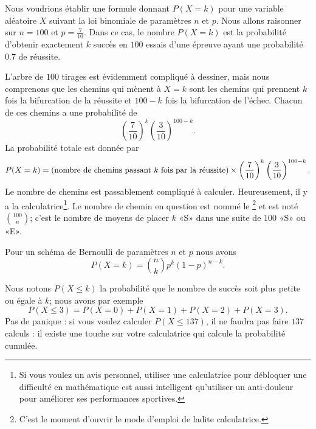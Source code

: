 Nous voudrions établir une formule donnant \( P(X=k)\) pour une variable aléatoire \( X\) suivant la loi binomiale de paramètres \( n\) et \( p\). Nous allons raisonner sur \( n=100\) et \( p=\frac{ 7 }{ 10 }\). Dans ce cas, le nombre \( P(X=k)\) est la probabilité d'obtenir exactement \( k\) succès en \( 100\) essais d'une épreuve ayant une probabilité \( 0.7\) de réussite.

L'arbre de \( 100\) tirages est évidemment compliqué à dessiner, mais nous comprenons que les chemins qui mènent à \( X=k\) sont les chemins qui prennent \( k\) fois la bifurcation de la réussite et \( 100-k\) fois la bifurcation de l'échec. Chacun de ces chemins a une probabilité de
\begin{equation}
    \left( \frac{ 7 }{ 10 } \right)^{k}\left( \frac{ 3 }{ 10 } \right)^{100-k}.
\end{equation}
La probabilité totale est donnée par
\begin{equation}
    P(X=k)=(\text{nombre de chemins passant \( k\) fois par la réussite})\times \left( \frac{ 7 }{ 10 } \right)^k\left( \frac{ 3 }{ 10 } \right)^{100-k}.
\end{equation}
Le nombre de chemins est passablement compliqué à calculer. Heureusement, il y a la calculatrice\footnote{Si vous voulez un avis personnel, utiliser une calculatrice pour débloquer une difficulté en mathématique est aussi intelligent qu'utiliser un anti-douleur pour améliorer ses performances sportives.}. Le nombre de chemin en question est nommé le \footnote{C'est le moment d'ouvrir le mode d'emploi de ladite calculatrice.} et est noté \( {100\choose n}\); c'est le nombre de moyens de placer \( k\) «S» dans une suite de \( 100\) «S» ou «E».

\begin{Aretenir}
    Pour un schéma de Bernoulli de paramètres \( n\) et \( p\) nous avons
    \begin{equation}
        P(X=k)={n\choose k}p^{k}(1-p)^{n-k}.
    \end{equation}
\end{Aretenir}

Nous notons \( P(X\leq k)\) la probabilité que le nombre de succès soit plus petite ou égale à \( k\); nous avons par exemple
\begin{equation}
    P(X\leq 3)=P(X=0)+P(X=1)+P(X=2)+P(X=3).
\end{equation}
Pas de panique : si vous voulez calculer \( P(X\leq 137)\), il ne faudra pas faire \( 137\) calculs : il existe une touche sur votre calculatrice qui calcule la probabilité cumulée.

